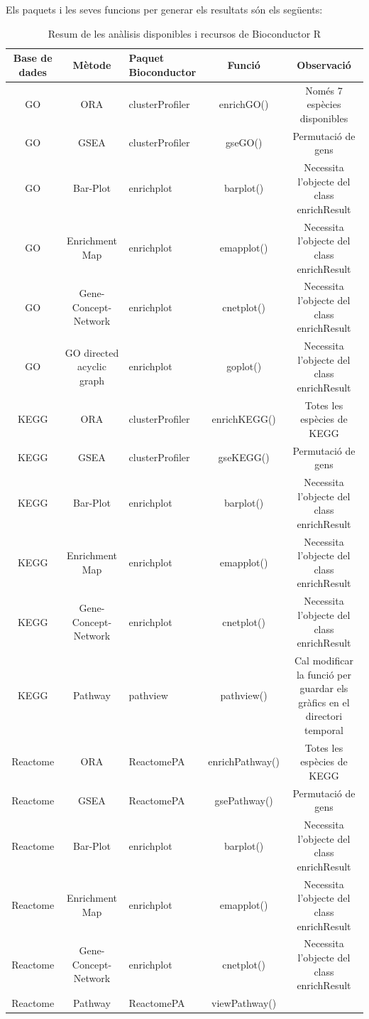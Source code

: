Els paquets i les seves funcions per generar els resultats són els següents: 

\begin{table}[H]
\begin{adjustbox}{width=1\textwidth}
\small
\begin{tabular}{|| c | c | l | c | c ||} 
\hline
Base de dades & Mètode & Paquet \gls{Bioconductor} & Funció & Observació \\ [0.5ex] 
\hline\hline
\gls{GO} & \gls{ORA} & clusterProfiler & enrichGO() & Només 7 espècies disponibles \\ 
\hline
GO & GSEA & clusterProfiler & gseGO() & Permutació de gens \\
\hline
GO & \gls{Bar-Plot} & enrichplot & barplot() & Necessita l'objecte del class enrichResult \\
\hline
GO & \gls{Enrichment Map} & enrichplot & emapplot() & Necessita l'objecte del class enrichResult \\
\hline
GO & \gls{Gene-Concept-Network} & enrichplot & cnetplot() & Necessita l'objecte del class enrichResult \\
\hline
GO & GO directed acyclic graph & enrichplot & goplot() & Necessita l'objecte del class enrichResult \\
\hline\hline
KEGG & ORA & clusterProfiler & enrichKEGG() & Totes les espècies de KEGG \\ 
\hline
KEGG & GSEA & clusterProfiler & gseKEGG() & Permutació de gens \\
\hline
KEGG & \gls{Bar-Plot} & enrichplot & barplot() & Necessita l'objecte del class enrichResult \\
\hline
KEGG & \gls{Enrichment Map} & enrichplot & emapplot() & Necessita l'objecte del class enrichResult \\
\hline
KEGG & \gls{Gene-Concept-Network} & enrichplot & cnetplot() & Necessita l'objecte del class enrichResult \\
\hline
KEGG & Pathway & pathview & pathview() & Cal modificar la funció per guardar els gràfics en el directori temporal \\
\hline\hline
Reactome & ORA & ReactomePA & enrichPathway() & Totes les espècies de KEGG \\ 
\hline
Reactome & GSEA & ReactomePA & gsePathway() & Permutació de gens \\
\hline
Reactome & \gls{Bar-Plot} & enrichplot & barplot() & Necessita l'objecte del class enrichResult \\
\hline
Reactome & \gls{Enrichment Map} & enrichplot & emapplot() & Necessita l'objecte del class enrichResult \\
\hline
Reactome & \gls{Gene-Concept-Network} & enrichplot & cnetplot() & Necessita l'objecte del class enrichResult \\
\hline
Reactome & Pathway & ReactomePA & viewPathway() & \\
\hline
\hline
\end{tabular}
\end{adjustbox}
\caption{Resum de les anàlisis disponibles i recursos de \gls{Bioconductor} R} 
\end{table}



